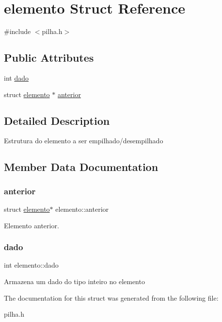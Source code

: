 \hypertarget{structelemento}{}\section{elemento Struct Reference}
\label{structelemento}


{\ttfamily \#include $<$pilha.\+h$>$}

\subsection*{Public Attributes}
\begin{DoxyCompactItemize}
\item 
int \mbox{\hyperlink{structelemento_ab9309655fd681012d15793f77012b6ad}{dado}}
\item 
struct \mbox{\hyperlink{structelemento}{elemento}} $\ast$ \mbox{\hyperlink{structelemento_a96f30997b93371f5a62c192a0b9282f7}{anterior}}
\end{DoxyCompactItemize}


\subsection{Detailed Description}
Estrutura do elemento a ser empilhado/desempilhado 

\subsection{Member Data Documentation}
\mbox{\label{structelemento_a96f30997b93371f5a62c192a0b9282f7}} 
\subsubsection{\texorpdfstring{anterior}{anterior}}
{\footnotesize\ttfamily struct \mbox{\hyperlink{structelemento}{elemento}}$\ast$ elemento\+::anterior}

Elemento anterior. \mbox{\label{structelemento_ab9309655fd681012d15793f77012b6ad}} 
\subsubsection{\texorpdfstring{dado}{dado}}
{\footnotesize\ttfamily int elemento\+::dado}

Armazena um dado do tipo inteiro no elemento 

The documentation for this struct was generated from the following file\+:\begin{DoxyCompactItemize}
\item 
pilha.\+h\end{DoxyCompactItemize}
